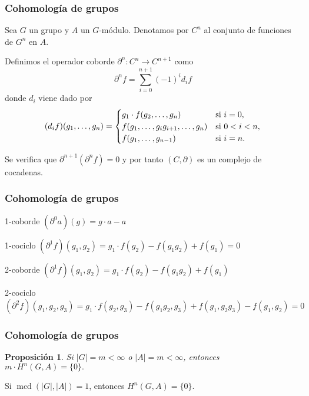\documentclass[
	11pt, %
]{beamer}
\DeclareMathOperator{\mcd}{mcd}
\newcommand{\ord}[1]{\left|#1\right|}%
\newcommand{\homo}[3]{#1\colon #2\to #3}
\newtheorem{proposition}{Proposici\'on}
\begin{document}
\begin{frame}
	\frametitle{Cohomología de grupos}
	
	Sea $G$ un grupo y $A$ un $G$-módulo. Denotamos por $C^n$ al conjunto de funciones de $G^n$ en $A$.
	
	Definimos el operador coborde  $\homo {\partial^n} {C^n} {C^{n+1}}$ como
	\begin{equation*}
		\partial^n f = \sum\limits_{i=0}^{n+1} (-1)^{i} d_i f
	\end{equation*}
	donde $d_i$ viene dado por 
	\begin{equation*}
		(d_if)(g_1,\ldots,g_n) = 
		\begin{cases} 
			g_1\cdot f(g_2,\ldots,g_n) 				& \text{si $ i=0$}, \\
			f(g_1,\ldots,g_ig_{i+1},\ldots,g_n) 	& \text{si $ 0 < i <n$}, \\
			f(g_1,\ldots,g_{n-1}) 				& \text{si $ i=n$}.
		\end{cases}
	\end{equation*}
	
	Se verifica que $\partial^{n+1}(\partial^n f) = 0$ y por tanto $(C,\partial)$ es un complejo de cocadenas.
\end{frame}

\begin{frame}
	\frametitle{Cohomología de grupos}
	
	\begin{exampleblock}{1-coborde}
		 \centering$(\partial^0 a)(g) = g\cdot a - a$
	\end{exampleblock}
	\begin{exampleblock}{1-cociclo}
		 \centering$(\partial^1 f)(g_1,g_2) = g_1\cdot f(g_2) - f(g_1g_2) + f(g_1) = 0$
	\end{exampleblock}
	\begin{exampleblock}{2-coborde}
		 \centering$(\partial^1 f)(g_1,g_2) = g_1\cdot f(g_2) - f(g_1g_2) + f(g_1)$
	\end{exampleblock}
	\begin{exampleblock}{2-cociclo}
		 \centering$(\partial^2 f)(g_1,g_2,g_3) = g_1\cdot f(g_2,g_3) - f(g_1g_2,g_3) + f(g_1,g_2g_3) - f(g_1,g_2)=0$
	\end{exampleblock}
	
\end{frame}

\begin{frame}
	\frametitle{Cohomología de grupos}
	
	\begin{proposition}
		Si $\ord{G} = m<\infty$ o $\ord{A} = m<\infty$, entonces $m\cdot H^{n}(G,A) = \{0\}.$
	\end{proposition}
	
	\begin{theorem}
		Si $\mcd(\ord{G},\ord{A}) = 1$, entonces $H^{n}(G,A) = \{0\}.$
	\end{theorem}
\end{frame}
\end{document}
